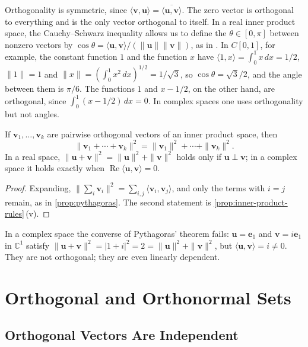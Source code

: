 Orthogonality is symmetric, since $\langle\mathbf v,\mathbf u\rangle=\overline{\langle\mathbf u,\mathbf v\rangle}$. The zero vector is orthogonal to everything and is the only vector orthogonal to itself. In a real inner product space, the Cauchy--Schwarz inequality allows us to define the  $\theta\in[0,\pi]$ between nonzero vectors by $\cos\theta=\langle\mathbf u,\mathbf v\rangle/(\|\mathbf u\|\|\mathbf v\|)$, as in . In $C[0,1]$, for example, the constant function $1$ and the function $x$ have $\langle1,x\rangle=\int_0^1x\,dx=1/2$, $\|1\|=1$ and $\|x\|=(\int_0^1x^2\,dx)^{1/2}=1/\sqrt3$, so $\cos\theta=\sqrt3/2$, and the angle between them is $\pi/6$. The functions $1$ and $x-1/2$, on the other hand, are orthogonal, since $\int_0^1(x-1/2)\,dx=0$. In complex spaces one uses orthogonality but not angles.

\begin{proposition}
\label{prop:pythagoras-general}
If $\mathbf v_1,\ldots,\mathbf v_k$ are pairwise orthogonal vectors of an inner product space, then
\[
\|\mathbf v_1+\cdots+\mathbf v_k\|^2=\|\mathbf v_1\|^2+\cdots+\|\mathbf v_k\|^2 .
\]
In a real space, $\|\mathbf u+\mathbf v\|^2=\|\mathbf u\|^2+\|\mathbf v\|^2$ holds only if $\mathbf u\perp\mathbf v$; in a complex space it holds exactly when $\operatorname{Re}\langle\mathbf u,\mathbf v\rangle=0$.
\end{proposition}

\begin{proof}
Expanding, $\|\sum_i\mathbf v_i\|^2=\sum_{i,j}\langle\mathbf v_i,\mathbf v_j\rangle$, and only the terms with $i=j$ remain, as in \cref{prop:pythagoras}. The second statement is \cref{prop:inner-product-rules}\,(v).
\end{proof}

In a complex space the converse of Pythagoras' theorem fails: $\mathbf u=\mathbf e_1$ and $\mathbf v=i\mathbf e_1$ in $\mathbb C^1$ satisfy $\|\mathbf u+\mathbf v\|^2=|1+i|^2=2=\|\mathbf u\|^2+\|\mathbf v\|^2$, but $\langle\mathbf u,\mathbf v\rangle=i\ne0$. They are not orthogonal; they are even linearly dependent.

\section{Orthogonal and Orthonormal Sets}
\label{sec:orthonormal-sets}

\subsection{Orthogonal Vectors Are Independent}

